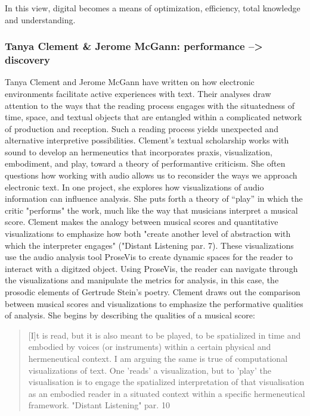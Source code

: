 \documentclass[11pt]{article}
\begin{document}
In this view, digital becomes a means of optimization, efficiency,
total knowledge and understanding.
\subsubsection{Tanya Clement \& Jerome McGann: performance --> discovery}
\label{sec:org41d18ea}
Tanya Clement and Jerome McGann have written on how electronic
environments facilitate active experiences with text. Their analyses
draw attention to the ways that the reading process engages with the
situatedness of time, space, and textual objects that are entangled
within a complicated network of production and reception. Such a
reading process yields unexpected and alternative interpretive
possibilities. Clement's textual scholarship works with sound to
develop an hermeneutics that incorporates praxis, visualization,
embodiment, and play, toward a theory of performantive criticism. She
often questions how working with audio allows us to reconsider the
ways we approach electronic text. In one project, she explores how
visualizations of audio information can influence analysis. She puts
forth a theory of “play” in which the critic "performs" the work, much
like the way that musicians interpret a musical score. Clement makes
the analogy between musical scores and quantitative visualizations to
emphasize how both "create another level of abstraction with which the
interpreter engages" ("Distant Listening par. 7). These visualizations
use the audio analysis tool ProseVis to create dynamic spaces for the
reader to interact with a digitzed object. Using ProseVis, the reader
can navigate through the visualizations and manipulate the metrics for
analysis, in this case, the prosodic elements of Gertrude Stein's
poetry. Clement draws out the comparison between musical scores and
visualizations to emphasize the performative qualities of
analysis. She begins by describing the qualities of a musical score:

\begin{quote}
[I]t is read, but it is also meant to be played, to be spatialized in
time and embodied by voices (or instruments) within a certain physical
and hermeneutical context. I am arguing the same is true of
computational visualizations of text. One 'reads' a visualization, but
to 'play' the visualisation is to engage the spatialized
interpretation of that visualisation as an embodied reader in a
situated context within a specific hermeneutical framework. "Distant
Listening" par. 10
\end{quote}
\end{document}

